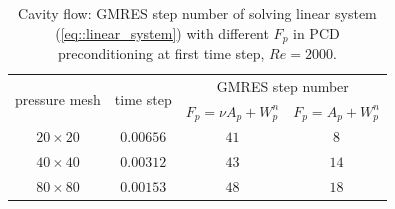 \documentclass{eajam}
\begin{document}
       \begin{table}[!htbp]
         \centering
         \begin{tabular}{cccc}
           \toprule
           \multirow{2}{*}{pressure mesh}    & \multirow{2}{*}{time
             step} & \multicolumn{2}{c}{GMRES step number} \\
           \cline{3-4}
            &               & $F_p = \nu A_p + W_p^n$ & $F_p = A_p + W_p^n$ \\ \midrule
           $20 \times 20$   &   $0.00656$         &      $41$           &     $8$
           \\ \midrule
           $40 \times 40$   &   $0.00312$         &      $43$           &     $14$
           \\ \midrule       
           $80 \times 80$   &   $0.00153$   &      $48$    &     $18$
           \\ \bottomrule 
         \end{tabular}
         \caption{Cavity flow: GMRES step number of solving linear system
           (\ref{eq::linear_system}) with different $F_p$ in PCD
           preconditioning at first time step, $Re = 2000$.}
         \label{tab::GMRES_steps_initial}
       \end{table}

      
      
 
\end{document}
